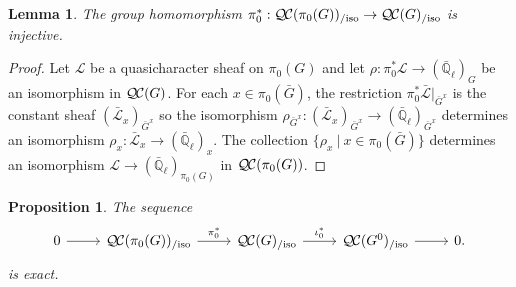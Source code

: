 \documentclass{amsart}
\theoremstyle{plain}
\newtheorem{proposition}[theorem]{Proposition}
\newtheorem{lemma}[theorem]{Lemma}
\theoremstyle{definition}
\theoremstyle{remark}
\newcommand{\EE}{\mathbb{\bar Q}_\ell}
\newcommand{\tq}{{\ \vert\ }}
\newcommand{\qcs}[1]{{\mathcal{#1}}}
\newcommand{\gqcs}[1]{{\mathcal{\bar #1}}}
\newcommand{\QC}{{\mathcal{Q\hskip-0.8pt C}}}
\newcommand{\QCiso}[1]{\QC(#1)_{/\text{iso}}}
\newcommand{\bG}{\bar{G}}
\begin{document}
\begin{lemma}\label{lem:extension}
The group homomorphism $\pi_0^*: \QCiso{\pi_0(G)} \to \QCiso{G}$ is injective.
\end{lemma}
\begin{proof}
Let $\qcs{L}$ be a quasicharacter sheaf on $\pi_0(G)$ and let $\rho : \pi_0^*\qcs{L} \to (\EE)_{G}$ be an isomorphism in $\QC(G)$. For each $x\in \pi_0(\bG)$, the restriction $\pi_0^*\gqcs{L}\vert_{\bG^x}$ is the constant sheaf $(\gqcs{L}_x)_{\bG^x}$ so the isomorphism $\rho_{\bG^x} : (\gqcs{L}_x)_{\bG^x} \to (\EE)_{\bG^x}$ determines an isomorphism $\rho_x : \gqcs{L}_x \to (\EE)_x$. The collection $\{ \rho_x \tq x\in \pi_0(\bG) \}$ determines an isomorphism $\qcs{L} \to (\EE)_{\pi_0(G)}$  in $\QC(\pi_0(G))$.
\end{proof}


\begin{proposition}\label{prop:middleexact}
 The sequence
 \[
  \begin{tikzcd}
  0 \rar & \QCiso{\pi_0(G)} \arrow{r}{\pi_0^*} & \QCiso{G} \arrow{r}{\iota_0^*} & \QCiso{G^0} \rar & 0.
  \end{tikzcd}
 \]
 is exact.
\end{proposition}
\end{document}
